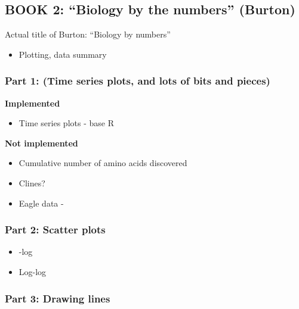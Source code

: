 \documentclass[
]{book}
\providecommand{\tightlist}{%
  \setlength{\itemsep}{0pt}\setlength{\parskip}{0pt}}
\begin{document}
\hypertarget{book-2-biology-by-the-numbers-burton}{%
\subsection{BOOK 2: ``Biology by the numbers'' (Burton)}\label{book-2-biology-by-the-numbers-burton}}

Actual title of Burton: ``Biology by numbers''

\begin{itemize}
\tightlist
\item
  Plotting, data summary
\end{itemize}

\hypertarget{part-1-time-series-plots-and-lots-of-bits-and-pieces}{%
\subsubsection{Part 1: (Time series plots, and lots of bits and pieces)}\label{part-1-time-series-plots-and-lots-of-bits-and-pieces}}

\textbf{Implemented}

\begin{itemize}
\tightlist
\item
  Time series plots - base R
\end{itemize}

\textbf{Not implemented}

\begin{itemize}
\tightlist
\item
  Cumulative number of amino acids discovered
\item
  Clines?
\item
  Eagle data -
\end{itemize}

\hypertarget{part-2-scatter-plots}{%
\subsubsection{Part 2: Scatter plots}\label{part-2-scatter-plots}}

\begin{itemize}
\tightlist
\item
  -log
\item
  Log-log
\end{itemize}

\hypertarget{part-3-drawing-lines}{%
\subsubsection{Part 3: Drawing lines}\label{part-3-drawing-lines}}
\end{document}
